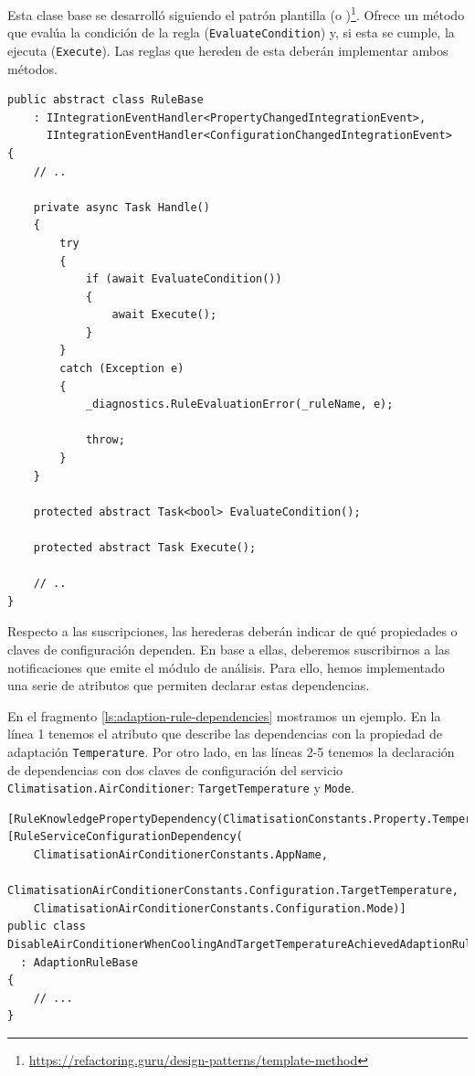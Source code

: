 Esta clase base se desarrolló siguiendo el patrón plantilla (o )\footnote{\url{https://refactoring.guru/design-patterns/template-method}}. Ofrece un método que evalúa la condición de la regla (\texttt{EvaluateCondition}) y, si esta se cumple, la ejecuta (\texttt{Execute}). Las reglas que hereden de esta deberán implementar ambos métodos.

\begin{lstlisting}[language={[Sharp]C},caption={Clase base para implementar reglas de adaptación. Se evalúa la condición, y si esta se cumple, se ejecuta.},captionpos=b, label=ls:adaption-rule-base]
public abstract class RuleBase
    : IIntegrationEventHandler<PropertyChangedIntegrationEvent>,
      IIntegrationEventHandler<ConfigurationChangedIntegrationEvent>
{
    // ..

    private async Task Handle()
    {
        try
        {
            if (await EvaluateCondition())
            {
                await Execute();
            }
        }
        catch (Exception e)
        {
            _diagnostics.RuleEvaluationError(_ruleName, e);

            throw;
        }
    }

    protected abstract Task<bool> EvaluateCondition();

    protected abstract Task Execute();

    // ..
}
\end{lstlisting}

Respecto a las suscripciones, las herederas deberán indicar de qué propiedades o claves de configuración dependen. En base a ellas, deberemos suscribirnos a las notificaciones que emite el módulo de análisis. Para ello, hemos implementado una serie de atributos que permiten declarar estas dependencias.

En el fragmento \ref{ls:adaption-rule-dependencies} mostramos un ejemplo. En la línea 1 tenemos el atributo que describe las dependencias con la propiedad de adaptación \texttt{Temperature}. Por otro lado, en las líneas 2-5 tenemos la declaración de dependencias con dos claves de configuración del servicio \texttt{Climatisation.AirConditioner}: \texttt{TargetTemperature} y \texttt{Mode}.
\begin{lstlisting}[language={[Sharp]C},caption={Las reglas declaran sus dependencias sobre propiedades de adaptación usando atributos. Estos se utilizarán para las suscripciones a los temas de los eventos.},captionpos=b, label=ls:adaption-rule-dependencies]
[RuleKnowledgePropertyDependency(ClimatisationConstants.Property.Temperature)]
[RuleServiceConfigurationDependency(
    ClimatisationAirConditionerConstants.AppName,
    ClimatisationAirConditionerConstants.Configuration.TargetTemperature,
    ClimatisationAirConditionerConstants.Configuration.Mode)]
public class DisableAirConditionerWhenCoolingAndTargetTemperatureAchievedAdaptionRule
  : AdaptionRuleBase
{
    // ...
}
\end{lstlisting}

